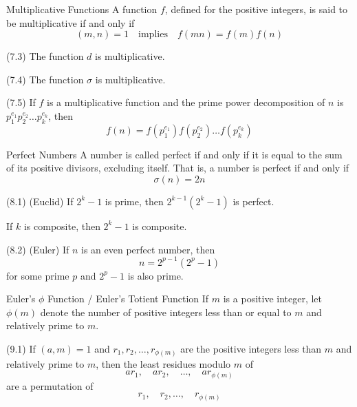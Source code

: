 \documentclass[12pt]{article}
\begin{document}
\begin{definition}{Multiplicative Functions}{}
    A function $ f $, defined for the positive integers, is said to be multiplicative if and only if
    \[ \left( m, n \right) = 1 \quad \text{implies} \quad f \left( mn \right) = f \left( m \right) f \left( n \right) \]
\end{definition}
\begin{theorem}{(7.3)}{}
    The function $ d $ is multiplicative.
\end{theorem}
\begin{theorem}{(7.4)}{}
    The function $ \sigma $ is multiplicative.
\end{theorem}
\begin{theorem}{(7.5)}{}
    If $ f $ is a multiplicative function and the prime power decomposition of $ n $ is $ p_1^{e_1} p_2^{e_2} \dots p_k^{e_k} $, then
    \[ f(n) = f \left( p_1^{e_1} \right) f \left( p_2^{e_2} \right) \dots f \left( p_k^{e_k} \right) \]
\end{theorem}
\begin{definition}{Perfect Numbers}{}
    A number is called perfect if and only if it is equal to the sum of its positive divisors, excluding itself. That is, a number is perfect if and only if
    \[ \sigma \left( n \right) = 2n \]
\end{definition}
\begin{theorem}{(8.1) (Euclid)}{}
    If $ 2^k - 1 $ is prime, then $ 2^{k-1} \left( 2^k - 1 \right) $ is perfect.
\end{theorem}
\begin{lemma}{}{}
    If $ k $ is composite, then $ 2^k - 1 $ is composite.
\end{lemma}
\begin{theorem}{(8.2) (Euler)}{}
    If $ n $ is an even perfect number, then
    \[ n = 2^{p - 1} \left( 2^p - 1 \right) \]
    for some prime $ p $ and $ 2^p - 1 $ is also prime.
\end{theorem}
\begin{definition}{Euler's $ \phi $ Function / Euler's Totient Function}{}
    If $ m $ is a positive integer, let $ \phi \left( m \right) $ denote the number of positive integers less than or equal to $ m $ and relatively prime to $ m $.
\end{definition}
\begin{lemma}{(9.1)}{}
    If $ \left( a, m \right) = 1 $ and $ r_1, r_2, \dots, r_{\phi \left( m \right)} $ are the positive integers less than $ m $ and relatively prime to $ m $, then the least residues modulo $ m $ of
    \[ ar_1, \quad ar_2, \quad \dots, \quad ar_{\phi \left( m \right)} \]
    are a permutation of
    \[ r_1, \quad r_2, \dots, \quad r_{\phi \left( m \right)} \]
\end{lemma}
\end{document}
